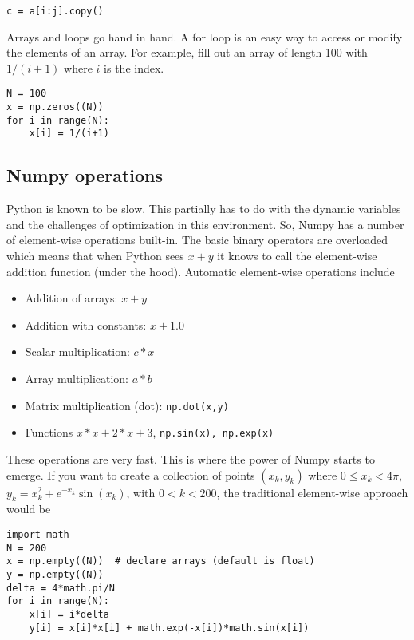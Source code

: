 \begin{verbatim}
c = a[i:j].copy()
\end{verbatim}

Arrays and loops go hand in hand. A for loop is an easy way to access or
modify the elements of an array. For example, fill out an array of
length 100 with \(1/(i+1)\) where \(i\) is the index.

\begin{verbatim}
N = 100
x = np.zeros((N))
for i in range(N):
    x[i] = 1/(i+1)
\end{verbatim}

\hypertarget{numpy-operations}{%
\subsection{Numpy operations}\label{numpy-operations}}

Python is known to be slow. This partially has to do with the dynamic
variables and the challenges of optimization in this environment. So,
Numpy has a number of element-wise operations built-in. The basic binary
operators are overloaded which means that when Python sees \(x+y\) it
knows to call the element-wise addition function (under the hood).
Automatic element-wise operations include

\begin{itemize}
\tightlist
\item
  Addition of arrays: \(x + y\)
\item
  Addition with constants: \(x + 1.0\)
\item
  Scalar multiplication: \(c*x\)
\item
  Array multiplication: \(a*b\)
\item
  Matrix multiplication (dot): \texttt{np.dot(x,y)}
\item
  Functions \(x*x + 2*x + 3\), \texttt{np.sin(x),\ np.exp(x)}
\end{itemize}

These operations are very fast. This is where the power of Numpy starts
to emerge. If you want to create a collection of points \((x_k,y_k)\)
where \(0 \leq x_k < 4\pi\), \(y_k = x_k^2 + e^{-x_k}\sin(x_k)\), with
\(0 < k < 200\), the traditional element-wise approach would be

\begin{verbatim}
import math
N = 200
x = np.empty((N))  # declare arrays (default is float)
y = np.empty((N))
delta = 4*math.pi/N
for i in range(N):
    x[i] = i*delta
    y[i] = x[i]*x[i] + math.exp(-x[i])*math.sin(x[i])
\end{verbatim}

